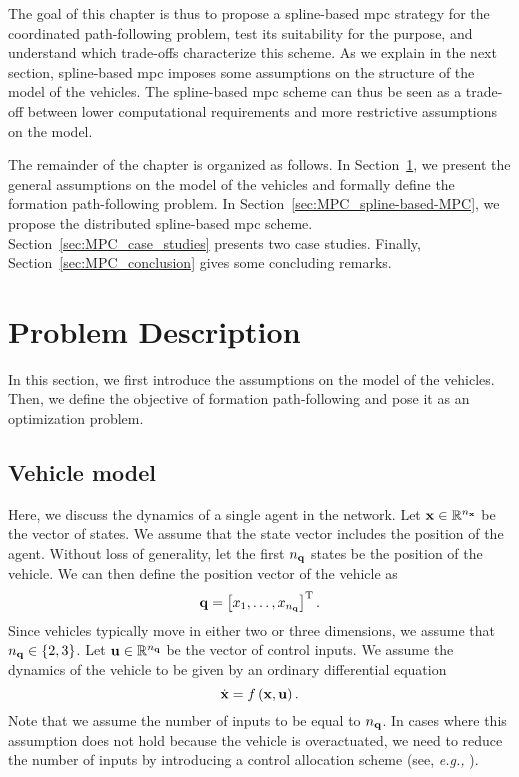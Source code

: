 The goal of this chapter is thus to propose a spline-based \gls{mpc} strategy for the coordinated path-following problem, test its suitability for the purpose, and understand which trade-offs characterize this scheme. As we explain in the next section, spline-based \gls{mpc} imposes some assumptions on the structure of the model of the vehicles.    
The spline-based \gls{mpc} scheme can thus be seen as a trade-off between lower computational requirements and more restrictive assumptions on the model.

The remainder of the chapter is organized as follows.
In Section~\ref{sec:MPC_problem-description}, we present the general assumptions on the model of the vehicles and formally define the formation path-following problem.
In Section~\ref{sec:MPC_spline-based-MPC}, we propose the distributed spline-based \gls{mpc} scheme.
Section~\ref{sec:MPC_case_studies} presents two case studies.
Finally, Section~\ref{sec:MPC_conclusion} gives some concluding remarks.

\section{Problem Description}
\label{sec:MPC_problem-description}

In this section, we first introduce the assumptions on the model of the vehicles.
Then, we define the objective of formation path-following and pose it as an optimization problem.



\subsection{Vehicle model}
\label{ssec:MPC_vehicle-model}



Here, we discuss the dynamics of a single agent in the network. Let $\mathbf{x} \in \mathbb{R}^{n_{\mathbf{x}}}$ be the vector of states.
We assume that the state vector includes the position of the agent.
Without loss of generality, let the first $n_{\mathbf{q}}$ states be the position of the vehicle.
We can then define the position vector of the vehicle as
\begin{equation}
    \mathbf{q} = \left[x_1, \ldots, x_{n_{\mathbf{q}}}\right]^{\mathrm{T}}.
\end{equation}
Since vehicles typically move in either two or three dimensions, we assume that $n_{\mathbf{q}} \in \left\{2,3\right\}$.
Let $\mathbf{u} \in \mathbb{R}^{n_{\mathbf{q}}}$ be the vector of control inputs.
We assume the dynamics of the vehicle to be given by an ordinary differential equation
\begin{equation}
    \dot{\mathbf{x}} = f \left(\mathbf{x}, \mathbf{u}\right).
\label{equ:MPC_dynamics-of-an-agent}
\end{equation}
Note that we assume the number of inputs to be equal to $n_{\mathbf{q}}$.
In cases where this assumption does not hold because the vehicle is overactuated, we need to reduce the number of inputs by introducing a control allocation scheme (see, \emph{e.g.,} \cite{johansen_control_2013}).

